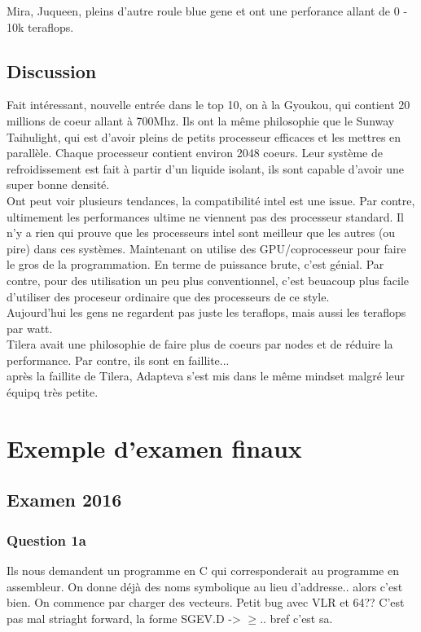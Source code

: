 \documentclass[oneside]{book}
\begin{document}
Mira, Juqueen, pleins d'autre roule blue gene et ont une perforance allant de 0 - 10k teraflops.\\

\section{Discussion}
Fait intéressant, nouvelle entrée dans le top 10, on à la Gyoukou, qui contient 20 millions de coeur allant à 700Mhz. Ils ont la même philosophie que le Sunway Taihulight, qui est d'avoir pleins de petits processeur efficaces et les mettres en parallèle. Chaque processeur contient environ 2048 coeurs. Leur système de refroidissement est fait à partir d'un liquide isolant, ils sont capable d'avoir une super bonne densité.\\

Ont peut voir plusieurs tendances, la compatibilité intel est une issue. Par contre, ultimement les performances ultime ne viennent pas des processeur standard. Il n'y a rien qui prouve que les processeurs intel sont meilleur que les autres (ou pire) dans ces systèmes. Maintenant on utilise des GPU/coprocesseur pour faire le gros de la programmation. En terme de puissance brute, c'est génial. Par contre, pour des utilisation un peu plus conventionnel, c'est beuacoup plus facile d'utiliser des proceseur ordinaire que des processeurs de ce style.\\

Aujourd'hui les gens ne regardent pas juste les teraflops, mais aussi les teraflops par watt.\\

Tilera avait une philosophie de faire plus de coeurs par nodes et de réduire la performance. Par contre, ils sont en faillite...\\

après la faillite de Tilera, Adapteva s'est mis dans le même mindset malgré leur équipq très petite.\\


\chapter{Exemple d'examen finaux}
\section{Examen 2016}
\subsection{Question 1a}
Ils nous demandent un programme en C qui corresponderait au programme en assembleur. On donne déjà des noms symbolique au lieu d'addresse.. alors c'est bien. On commence par charger des vecteurs. Petit bug avec VLR et 64?? C'est pas mal striaght forward, la forme SGEV.D -> $\geq$.. bref c'est sa.\\
\end{document}
